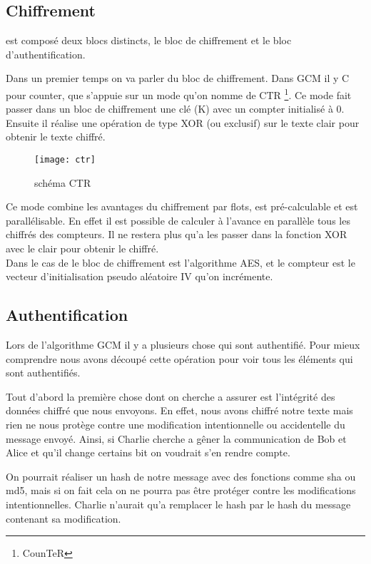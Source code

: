 \subsection{Chiffrement}

\aes est composé deux blocs distincts, le bloc de chiffrement et le bloc d'authentification.

Dans un premier temps on va parler du bloc de chiffrement. Dans GCM il y C pour \og counter\fg{}, \cad que \aes s'appuie sur un mode qu'on nomme de CTR \footnote{CounTeR}.
Ce mode fait passer dans un bloc de chiffrement une clé (K) avec un compter initialisé à 0. Ensuite il réalise une opération de type XOR (ou exclusif) sur le texte clair pour obtenir le texte chiffré. 

\begin{figure}[!h]
  \centering
  \texttt{[image: ctr]}
  \caption{schéma CTR \cite{wiki}}
  \label{schema CTR}
\end{figure}

 Ce mode combine les avantages du chiffrement par flots, est pré-calculable et est parallélisable. En effet il est possible de calculer à l'avance en parallèle tous les chiffrés des compteurs. Il ne restera plus qu'a les passer dans la fonction XOR avec le clair pour obtenir le chiffré.
 ~\\

 Dans le cas de \aes le bloc de chiffrement est l'algorithme AES, et le compteur est le vecteur d'initialisation pseudo aléatoire IV qu'on incrémente.


\subsection{Authentification}

Lors de l'algorithme GCM il y a plusieurs chose qui sont authentifié. Pour mieux comprendre nous avons découpé cette opération pour voir tous les éléments qui sont authentifiés.

Tout d'abord la première chose dont on cherche a assurer est l'intégrité des données chiffré que nous envoyons. En effet, nous avons chiffré notre texte mais rien ne nous protège contre une modification intentionnelle ou accidentelle du message envoyé. Ainsi, si Charlie cherche a gêner la communication de Bob et Alice et qu'il change certains bit on voudrait s'en rendre compte. 

On pourrait réaliser un hash de notre message avec des fonctions comme sha ou md5, mais si on fait cela on ne pourra pas être protéger contre les modifications intentionnelles. Charlie n'aurait qu'a remplacer le hash par le hash du message contenant sa modification. 

